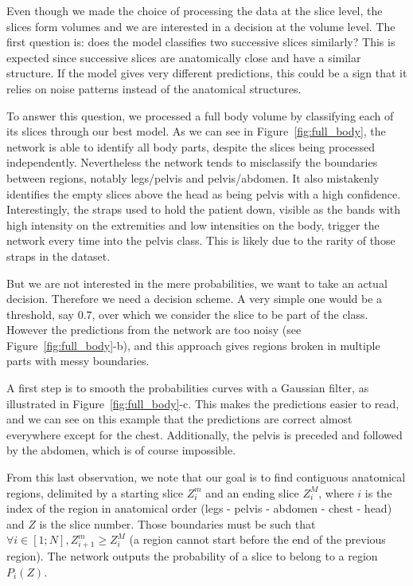 Even though we made the choice of processing the data at the slice level, the slices form volumes and we are interested in a decision at the volume level. The first question is: does the model classifies two successive slices similarly? This is expected since successive slices are anatomically close and have a similar structure. If the model gives very different predictions, this could be a sign that it relies on noise patterns instead of the anatomical structures.

To answer this question, we processed a full body volume by classifying each of its slices through our best model. 
As we can see in Figure~\ref{fig:full_body}, the network is able to identify all body parts, despite the slices being processed independently. Nevertheless the network tends to misclassify the boundaries between regions, notably legs/pelvis and pelvis/abdomen. It also mistakenly identifies the empty slices above the head as being pelvis with a high confidence. %
Interestingly, the straps used to hold the patient down, visible as the bands with high intensity on the extremities and low intensities on the body, trigger the network every time into the pelvis class. This is likely due to the rarity of those straps in the dataset.

But we are not interested in the mere probabilities, we want to take an actual decision. Therefore we need a decision scheme. A very simple one would be a threshold, say $0.7$, over which we consider the slice to be part of the class. However the predictions from the network are too noisy (see Figure~\ref{fig:full_body}-b), and this approach gives regions broken in multiple parts with messy boundaries.

A first step is to smooth the probabilities curves with a Gaussian filter, as illustrated in Figure~\ref{fig:full_body}-c. This makes the predictions easier to read, and we can see on this example that the predictions are correct almost everywhere except for the chest. Additionally, the pelvis is preceded and followed by the abdomen, which is of course impossible.

From this last observation, we note that our goal is to find contiguous anatomical regions, delimited by a starting slice $Z^m_i$ and an ending slice $Z^M_i$, where $i$ is the index of the region in anatomical order (legs - pelvis - abdomen - chest - head) and $Z$ is the slice number. Those boundaries must be such that 
$\forall i \in [1; N], Z^m_{i+1} \ge Z^M_i$ (a region cannot start before the end of the previous region). The network outputs the probability of a slice to belong to a region $P_i \left( Z \right)$.

